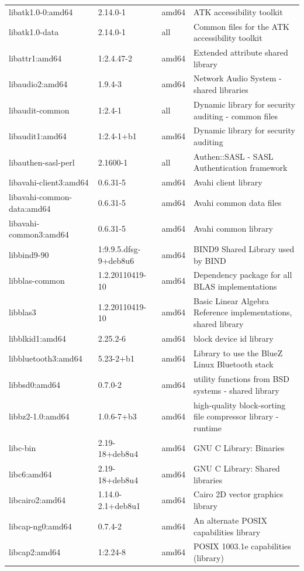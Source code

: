 \documentclass[a4paper,10pt]{article}
\begin{document}
\begin{appendices}
{\begin{longtable}{p{3.25cm}@{\hspace{0.25cm}}p{4cm}@{\hspace{0.25cm}}l@{\hspace{0.25cm}}p{7cm}}
libatk1.0-0:amd64	&	2.14.0-1	&	amd64	&	ATK accessibility toolkit	\\
libatk1.0-data	&	2.14.0-1	&	all	&	Common files for the ATK accessibility toolkit	\\
libattr1:amd64	&	1:2.4.47-2	&	amd64	&	Extended attribute shared library	\\
libaudio2:amd64	&	1.9.4-3	&	amd64	&	Network Audio System - shared libraries	\\
libaudit-common	&	1:2.4-1	&	all	&	Dynamic library for security auditing - common files	\\
libaudit1:amd64	&	1:2.4-1+b1	&	amd64	&	Dynamic library for security auditing	\\
libauthen-sasl-perl	&	2.1600-1	&	all	&	Authen::SASL - SASL Authentication framework	\\
libavahi-client3:amd64	&	0.6.31-5	&	amd64	&	Avahi client library	\\
libavahi-common-data:amd64	&	0.6.31-5	&	amd64	&	Avahi common data files	\\
libavahi-common3:amd64	&	0.6.31-5	&	amd64	&	Avahi common library	\\
libbind9-90	&	1:9.9.5.dfsg-9+deb8u6	&	amd64	&	BIND9 Shared Library used by BIND	\\
libblas-common	&	1.2.20110419-10	&	amd64	&	Dependency package for all BLAS implementations	\\
libblas3	&	1.2.20110419-10	&	amd64	&	Basic Linear Algebra Reference implementations, shared library	\\
libblkid1:amd64	&	2.25.2-6	&	amd64	&	block device id library	\\
libbluetooth3:amd64	&	5.23-2+b1	&	amd64	&	Library to use the BlueZ Linux Bluetooth stack	\\
libbsd0:amd64	&	0.7.0-2	&	amd64	&	utility functions from BSD systems - shared library	\\
libbz2-1.0:amd64	&	1.0.6-7+b3	&	amd64	&	high-quality block-sorting file compressor library - runtime	\\
libc-bin	&	2.19-18+deb8u4	&	amd64	&	GNU C Library: Binaries	\\
libc6:amd64	&	2.19-18+deb8u4	&	amd64	&	GNU C Library: Shared libraries	\\
libcairo2:amd64	&	1.14.0-2.1+deb8u1	&	amd64	&	Cairo 2D vector graphics library	\\
libcap-ng0:amd64	&	0.7.4-2	&	amd64	&	An alternate POSIX capabilities library	\\
libcap2:amd64	&	1:2.24-8	&	amd64	&	POSIX 1003.1e capabilities (library)	\\

\end{longtable}}
\end{appendices}
\end{document}

